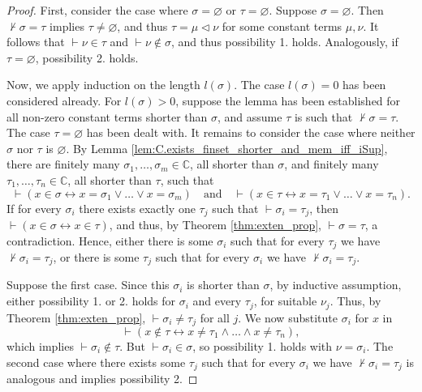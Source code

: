 \begin{proof}
    First, consider the case where $\sigma = \varnothing$ or $\tau = \varnothing$.
    Suppose $\sigma = \varnothing$.
    Then $\not\vdash \sigma = \tau$ implies $\tau \neq \varnothing$, and thus
    $\tau = \mu \lhd \nu$ for some constant terms $\mu, \nu$.
    It follows that $\vdash \nu \in \tau$ and $\vdash \nu \notin \sigma$, 
    and thus possibility 1. holds.
    Analogously, if $\tau = \varnothing$, possibility 2. holds.

    Now, we apply induction on the length $l(\sigma)$.
    The case $l(\sigma) = 0$ has been considered already.
    For $l(\sigma) > 0$, suppose the lemma has been established for all non-zero constant terms 
    shorter than $\sigma$, and assume $\tau$ is such that $\not\vdash \sigma = \tau$.
    The case $\tau = \varnothing$ has been dealt with.
    It remains to consider the case where neither $\sigma$ nor $\tau$ is $\varnothing$.
    By Lemma \ref{lem:C.exists_finset_shorter_and_mem_iff_iSup}, there are finitely many
    $\sigma_1, \ldots, \sigma_m \in \mathbb{C}$, all shorter than $\sigma$, and finitely many
    $\tau_1, \ldots, \tau_n \in \mathbb{C}$, all shorter than $\tau$, such that
    $$
    \vdash (x \in \sigma \leftrightarrow x = \sigma_1 \lor \ldots \lor x = \sigma_m)
    \quad \text{and} \quad 
    \vdash (x \in \tau \leftrightarrow x = \tau_1 \lor \ldots \lor x = \tau_n).
    $$
    If for every $\sigma_i$ there exists exactly one $\tau_j$ such that $\vdash \sigma_i = \tau_j$,
    then $\vdash (x \in \sigma \leftrightarrow x \in \tau)$, and thus, 
    by Theorem \ref{thm:exten_prop}, $\vdash \sigma = \tau$, a contradiction.
    Hence, either there is some $\sigma_i$ such that for every $\tau_j$ we have
    $\not\vdash \sigma_i = \tau_j$, or there is some $\tau_j$ such that for every $\sigma_i$ we have
    $\not\vdash \sigma_i = \tau_j$.

    Suppose the first case.
    Since this $\sigma_i$ is shorter than $\sigma$, by inductive assumption, 
    either possibility 1. or 2. holds for $\sigma_i$ and every $\tau_j$, for suitable $\nu_j$.
    Thus, by Theorem \ref{thm:exten_prop}, $\vdash \sigma_i \neq \tau_j$ for all $j$.
    We now substitute $\sigma_i$ for $x$ in 
    $$
    \vdash (x \notin \tau \leftrightarrow x \neq \tau_1 \land \ldots \land x \neq \tau_n),
    $$
    which implies $\vdash \sigma_i \notin \tau$.
    But $\vdash \sigma_i \in \sigma$, so possibility 1. holds with $\nu = \sigma_i$.
    The second case where there exists some $\tau_j$ such that for every $\sigma_i$ we have
    $\not\vdash \sigma_i = \tau_j$ is analogous and implies possibility 2.
\end{proof}


